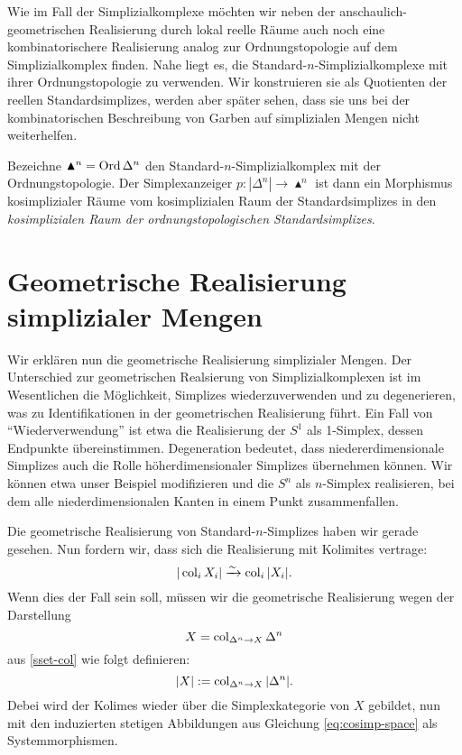 \begin{bem} \label{clumsy-real}
  Wie im Fall der Simplizialkomplexe möchten wir neben der
  anschaulich-geometrischen Realisierung durch lokal reelle Räume auch
  noch eine kombinatorischere Realisierung analog zur
  Ordnungstopologie auf dem Simplizialkomplex finden. Nahe liegt es,
  die Standard-$n$-Simplizialkomplexe mit ihrer Ordnungstopologie zu
  verwenden. Wir konstruieren sie als Quotienten der reellen
  Standardsimplizes, werden aber später sehen, dass sie uns bei der
  kombinatorischen Beschreibung von Garben auf simplizialen Mengen
  nicht weiterhelfen.

  Bezeichne $\blacktriangle^n = \operatorname{Ord} \Delta^n$ den
  Standard-$n$-Simplizialkomplex mit der Ordnungstopologie. Der
  Simplexanzeiger $p: |\Delta^n| \to \blacktriangle^n$ ist dann ein
  Morphismus kosimplizialer Räume vom kosimplizialen Raum der
  Standardsimplizes in den \emph{kosimplizialen Raum der
    ordnungstopologischen Standardsimplizes}.
\end{bem}

\section[Geometrische Realisierung simplizialer Mengen]
        {Geometrische Realisierung simplizialer Mengen
        }

Wir erklären nun die geometrische Realisierung simplizialer
Mengen. Der Unterschied zur geometrischen Realsierung von
Simplizialkomplexen ist im Wesentlichen die Möglichkeit, Simplizes
wiederzuverwenden und zu degenerieren, was zu Identifikationen in der
geometrischen Realisierung führt. Ein Fall von ``Wiederverwendung''
ist etwa die Realisierung der $S^1$ als 1-Simplex, dessen Endpunkte
übereinstimmen. Degeneration bedeutet, dass niedererdimensionale
Simplizes auch die Rolle höherdimensionaler Simplizes übernehmen
können. Wir können etwa unser Beispiel modifizieren und die $S^n$ als
$n$-Simplex realisieren, bei dem alle niederdimensionalen Kanten in
einem Punkt zusammenfallen.

Die geometrische Realisierung von Standard-$n$-Simplizes haben wir
gerade gesehen. Nun fordern wir, dass sich die Realisierung mit
Kolimites vertrage:
\begin{equation} \label{eq:real-cocont}
  |\operatorname{col}_i X_i| \xrightarrow[]{\sim} \operatorname{col}_i |X_i|.
\end{equation}
Wenn dies der Fall sein soll, müssen wir die geometrische Realisierung
wegen der Darstellung
\[ X = \operatorname{col}_{\Delta^n \to X} \Delta^n \]
aus \ref{sset-col} wie folgt definieren:
\begin{equation} \label{eq:real-colim}
  |X| := \operatorname{col}_{\Delta^n \to X} |\Delta^n|.
\end{equation}
Debei wird der Kolimes wieder über die Simplexkategorie von $X$
gebildet, nun mit den induzierten stetigen Abbildungen aus Gleichung
\ref{eq:cosimp-space} als Systemmorphismen.


